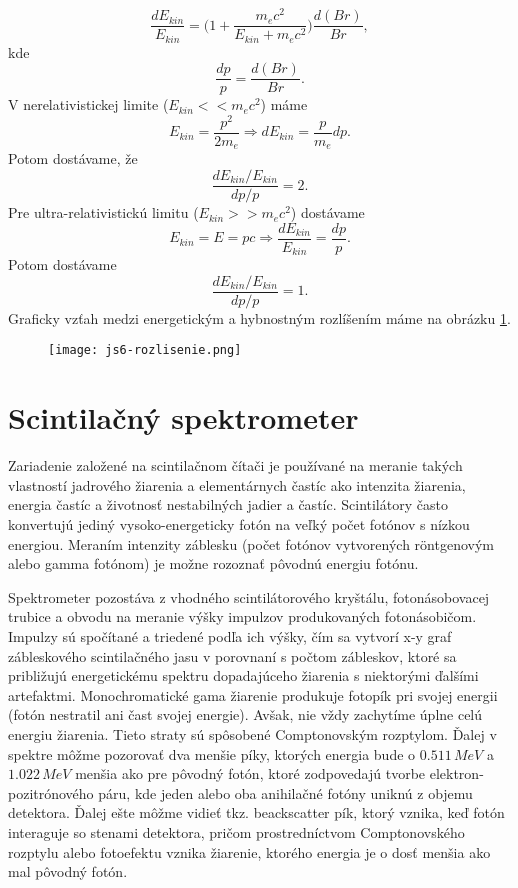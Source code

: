 \documentclass[../../main.tex]{subfiles}
\begin{document}
$$ \frac{dE_{kin}}{E_{kin}}=\bigg( 1+\frac{m_ec^2}{E_{kin}+m_ec^2}\bigg)\frac{d(Br)}{Br},$$ 
kde 
$$ \frac{dp}{p}=\frac{d(Br)}{Br}.$$
V nerelativistickej limite ($E_{kin} << m_ec^2$) máme 
$$ E_{kin}=\frac{p^2}{2m_e} \Rightarrow dE_{kin}=\frac{p}{m_e}dp.$$
Potom dostávame, že 
$$ \frac{dE_{kin}/E_{kin}}{dp/p}=2.$$
Pre ultra-relativistickú limitu ($E_{kin} >> m_ec^2$) dostávame 
$$ E_{kin}=E=pc \Rightarrow \frac{dE_{kin}}{E_{kin}}=\frac{dp}{p}.$$ 
Potom dostávame 
$$ \frac{dE_{kin}/E_{kin}}{dp/p}=1.$$
Graficky vzťah medzi energetickým a hybnostným rozlíšením máme na obrázku \ref{js6:fig:rozslisenie}.
\begin{figure}[!h]
\centering
\texttt{[image: js6-rozlisenie.png]}
\caption{}
\label{js6:fig:rozslisenie}
\end{figure}

\section{Scintilačný spektrometer}
Zariadenie založené na scintilačnom čítači je používané na meranie takých vlastností jadrového žiarenia a elementárnych častíc ako intenzita žiarenia, energia častíc a životnosť nestabilných jadier a častíc. Scintilátory často konvertujú jediný vysoko-energeticky fotón na veľký počet fotónov s nízkou energiou. Meraním intenzity záblesku (počet fotónov vytvorených r\"{o}ntgenovým alebo gamma fotónom) je možne rozoznať pôvodnú energiu fotónu.

Spektrometer pozostáva z vhodného scintilátorového kryštálu, fotonásobovacej trubice a obvodu na meranie výšky impulzov produkovaných fotonásobičom. Impulzy sú spočítané a triedené podľa ich výšky, čím sa vytvorí x-y graf zábleskového scintilačného jasu v porovnaní s počtom zábleskov, ktoré sa približujú energetickému spektru dopadajúceho žiarenia s niektorými ďalšími artefaktmi. Monochromatické gama žiarenie produkuje fotopík pri svojej energii (fotón nestratil ani čast svojej energie). Avšak, nie vždy zachytíme úplne celú energiu žiarenia. Tieto straty sú spôsobené Comptonovským rozptylom. Ďalej v spektre môžme pozorovať dva menšie píky, ktorých energia bude o $0.511\,MeV$ a $1.022\,MeV$ menšia ako pre pôvodný fotón, ktoré zodpovedajú tvorbe elektron-pozitrónového páru, kde jeden alebo oba anihilačné fotóny uniknú z objemu detektora. Ďalej ešte môžme vidieť tkz. beackscatter pík, ktorý vznika, keď fotón interaguje so stenami detektora, pričom prostredníctvom Comptonovského rozptylu alebo fotoefektu vznika žiarenie, ktorého energia je o dosť menšia ako mal pôvodný fotón.
\end{document}
